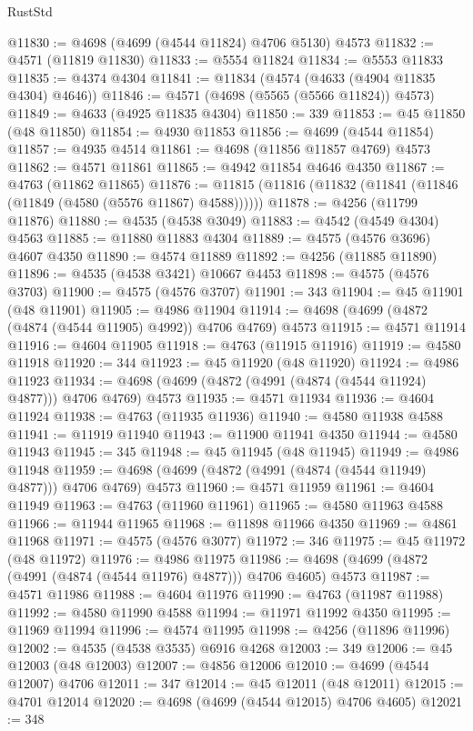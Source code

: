 \begin{lexlean}{RustStd}
\begin{coremodule}
@11830 := @4698 (@4699 (@4544 @11824) @4706 @5130) @4573
@11832 := @4571 (@11819 @11830)
@11833 := @5554 @11824
@11834 := @5553 @11833
@11835 := @4374 @4304
@11841 := @11834 (@4574 (@4633 (@4904 @11835 @4304) @4646))
@11846 := @4571 (@4698 (@5565 (@5566 @11824)) @4573)
@11849 := @4633 (@4925 @11835 @4304)
@11850 := 339
@11853 := @45 @11850 (@48 @11850)
@11854 := @4930 @11853
@11856 := @4699 (@4544 @11854)
@11857 := @4935 @4514
@11861 := @4698 (@11856 @11857 @4769) @4573
@11862 := @4571 @11861
@11865 := @4942 @11854 @4646 @4350
@11867 := @4763 (@11862 @11865)
@11876 := @11815 (@11816 (@11832 (@11841 (@11846 (@11849 (@4580 (@5576 @11867) @4588))))))
@11878 := @4256 (@11799 @11876)
@11880 := @4535 (@4538 @3049)
@11883 := @4542 (@4549 @4304) @4563
@11885 := @11880 @11883 @4304
@11889 := @4575 (@4576 @3696) @4607 @4350
@11890 := @4574 @11889
@11892 := @4256 (@11885 @11890)
@11896 := @4535 (@4538 @3421) @10667 @4453
@11898 := @4575 (@4576 @3703)
@11900 := @4575 (@4576 @3707)
@11901 := 343
@11904 := @45 @11901 (@48 @11901)
@11905 := @4986 @11904
@11914 := @4698 (@4699 (@4872 (@4874 (@4544 @11905) @4992)) @4706 @4769) @4573
@11915 := @4571 @11914
@11916 := @4604 @11905
@11918 := @4763 (@11915 @11916)
@11919 := @4580 @11918
@11920 := 344
@11923 := @45 @11920 (@48 @11920)
@11924 := @4986 @11923
@11934 := @4698 (@4699 (@4872 (@4991 (@4874 (@4544 @11924) @4877))) @4706 @4769) @4573
@11935 := @4571 @11934
@11936 := @4604 @11924
@11938 := @4763 (@11935 @11936)
@11940 := @4580 @11938 @4588
@11941 := @11919 @11940
@11943 := @11900 @11941 @4350
@11944 := @4580 @11943
@11945 := 345
@11948 := @45 @11945 (@48 @11945)
@11949 := @4986 @11948
@11959 := @4698 (@4699 (@4872 (@4991 (@4874 (@4544 @11949) @4877))) @4706 @4769) @4573
@11960 := @4571 @11959
@11961 := @4604 @11949
@11963 := @4763 (@11960 @11961)
@11965 := @4580 @11963 @4588
@11966 := @11944 @11965
@11968 := @11898 @11966 @4350
@11969 := @4861 @11968
@11971 := @4575 (@4576 @3077)
@11972 := 346
@11975 := @45 @11972 (@48 @11972)
@11976 := @4986 @11975
@11986 := @4698 (@4699 (@4872 (@4991 (@4874 (@4544 @11976) @4877))) @4706 @4605) @4573
@11987 := @4571 @11986
@11988 := @4604 @11976
@11990 := @4763 (@11987 @11988)
@11992 := @4580 @11990 @4588
@11994 := @11971 @11992 @4350
@11995 := @11969 @11994
@11996 := @4574 @11995
@11998 := @4256 (@11896 @11996)
@12002 := @4535 (@4538 @3535) @6916 @4268
@12003 := 349
@12006 := @45 @12003 (@48 @12003)
@12007 := @4856 @12006
@12010 := @4699 (@4544 @12007) @4706
@12011 := 347
@12014 := @45 @12011 (@48 @12011)
@12015 := @4701 @12014
@12020 := @4698 (@4699 (@4544 @12015) @4706 @4605)
@12021 := 348

\end{coremodule}
\end{lexlean}
